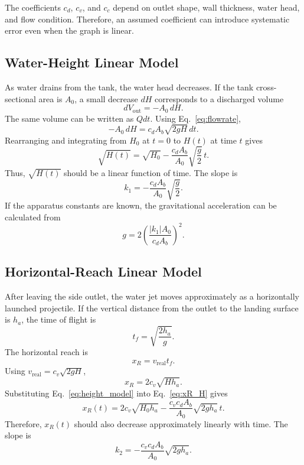 \documentclass[11pt,letterpaper]{article}
\begin{document}
The coefficients $c_d$, $c_v$, and $c_c$ depend on outlet shape, wall thickness, water head, and flow condition. Therefore, an assumed coefficient can introduce systematic error even when the graph is linear.

\subsection{Water-Height Linear Model}

As water drains from the tank, the water head decreases. If the tank cross-sectional area is $A_0$, a small decrease $dH$ corresponds to a discharged volume
\begin{equation}
    dV_{\text{out}}=-A_0\,dH.
\end{equation}
The same volume can be written as $Qdt$. Using Eq.~\eqref{eq:flowrate},
\begin{equation}
    -A_0\,dH=c_dA_b\sqrt{2gH}\,dt.
\end{equation}
Rearranging and integrating from $H_0$ at $t=0$ to $H(t)$ at time $t$ gives
\begin{equation}
    \sqrt{H(t)}
    =
    \sqrt{H_0}
    -
    \frac{c_dA_b}{A_0}\sqrt{\frac{g}{2}}\,t.
    \label{eq:height_model}
\end{equation}
Thus, $\sqrt{H(t)}$ should be a linear function of time. The slope is
\begin{equation}
    k_1=-\frac{c_dA_b}{A_0}\sqrt{\frac{g}{2}}.
    \label{eq:k1}
\end{equation}
If the apparatus constants are known, the gravitational acceleration can be calculated from
\begin{equation}
    g=2\left(\frac{|k_1|A_0}{c_dA_b}\right)^2.
    \label{eq:g_method1}
\end{equation}

\subsection{Horizontal-Reach Linear Model}

After leaving the side outlet, the water jet moves approximately as a horizontally launched projectile. If the vertical distance from the outlet to the landing surface is $h_a$, the time of flight is
\begin{equation}
    t_f=\sqrt{\frac{2h_a}{g}}.
\end{equation}
The horizontal reach is
\begin{equation}
    x_R=v_{\text{real}}t_f.
\end{equation}
Using $v_{\text{real}}=c_v\sqrt{2gH}$,
\begin{equation}
    x_R=2c_v\sqrt{Hh_a}.
    \label{eq:xR_H}
\end{equation}
Substituting Eq.~\eqref{eq:height_model} into Eq.~\eqref{eq:xR_H} gives
\begin{equation}
    x_R(t)=2c_v\sqrt{H_0h_a}
    -
    \frac{c_vc_dA_b}{A_0}\sqrt{2gh_a}\,t.
    \label{eq:reach_model}
\end{equation}
Therefore, $x_R(t)$ should also decrease approximately linearly with time. The slope is
\begin{equation}
    k_2=-\frac{c_vc_dA_b}{A_0}\sqrt{2gh_a}.
\end{equation}
\end{document}
